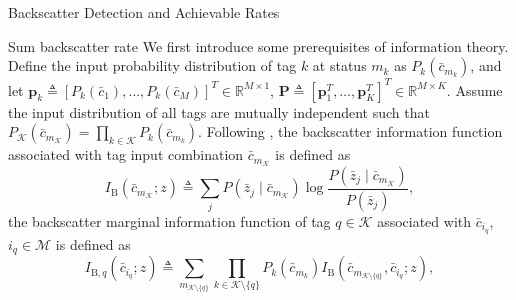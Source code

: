 \documentclass[journal]{IEEEtran}
\begin{document}
\begin{section}{Backscatter Detection and Achievable Rates}
		\begin{subsection}{Sum backscatter rate}
			We first introduce some prerequisites of information theory. Define the input probability distribution of tag $k$ at status $m_k$ as $P_k(\bar{c}_{m_k})$, and let $\boldsymbol{p}_k \triangleq [P_k(\bar{c}_1),\ldots,P_k(\bar{c}_M)]^T \in \mathbb{R}^{M \times 1}$, $\boldsymbol{P} \triangleq [\boldsymbol{p}_1^T,\ldots,\boldsymbol{p}_K^T]^T \in \mathbb{R}^{M \times K}$. Assume the input distribution of all tags are mutually independent such that $P_{\mathcal{K}}(\bar{c}_{m_{\mathcal{K}}}) = \prod_{k \in \mathcal{K}} P_k(\bar{c}_{m_k})$. Following \cite{Rezaeian2004}, the backscatter information function associated with tag input combination $\bar{c}_{m_{\mathcal{K}}}$ is defined as
			\begin{equation}
				I_{\mathrm{B}}(\bar{c}_{m_{\mathcal{K}}};z) \triangleq \sum_j P(\bar{z}_j \mid \bar{c}_{m_{\mathcal{K}}}) \log \frac{P(\bar{z}_j \mid \bar{c}_{m_{\mathcal{K}}})}{P(\bar{z}_j)},
				\label{eq:backscatter_information_function}
			\end{equation}
			the backscatter marginal information function of tag $q \in \mathcal{K}$ associated with $\bar{c}_{i_q}$, $i_q \in \mathcal{M}$ is defined as
			\begin{equation}
				I_{\mathrm{B},q}(\bar{c}_{i_q};z) \triangleq \sum_{m_{\mathcal{K} \setminus \{q\}}} \prod_{k \in \mathcal{K} \setminus \{q\}} P_k(\bar{c}_{m_k}) I_{\mathrm{B}}(\bar{c}_{m_{\mathcal{K} \setminus \{q\}}},\bar{c}_{i_q};z),
				\label{eq:backscatter_marginal_information_function}
			\end{equation}

\end{subsection}
\end{section}
\end{document}
